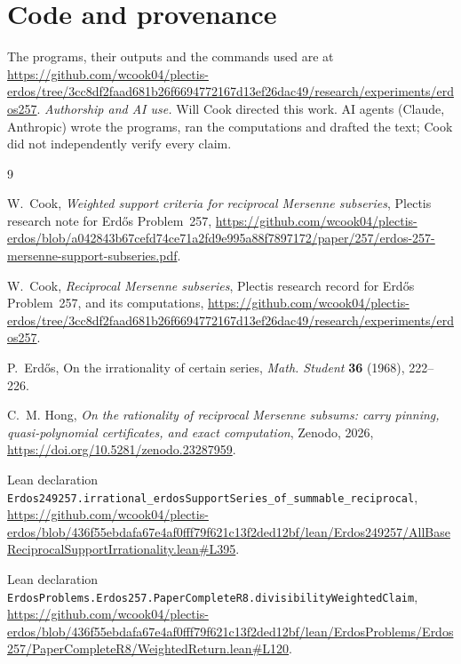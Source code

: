 \documentclass[11pt]{amsart}
\newcommand{\pin}{436f55ebdafa67e4af0fff79f621c13f2ded12bf}
\newcommand{\codeurl}{https://github.com/wcook04/plectis-erdos/tree/3cc8df2faad681b26f6694772167d13ef26dac49/research/experiments/erdos257}
\begin{document}
\section*{Code and provenance}
The programs, their outputs and the commands used are at \url{\codeurl}.
\emph{Authorship and AI use.} Will Cook directed this work. AI agents (Claude,
Anthropic) wrote the programs, ran the computations and drafted the text; Cook
did not independently verify every claim.

{\small
\begin{thebibliography}{9}

W.~Cook, \emph{Weighted support criteria for reciprocal Mersenne subseries},
Plectis research note for Erd\H{o}s Problem~257,
\url{https://github.com/wcook04/plectis-erdos/blob/a042843b67cefd74ce71a2fd9e995a88f7897172/paper/257/erdos-257-mersenne-support-subseries.pdf}.

W.~Cook, \emph{Reciprocal Mersenne subseries}, Plectis research record for
Erd\H{o}s Problem~257, and its computations,
\url{\codeurl}.

P.~Erd\H{o}s, On the irrationality of certain series, \emph{Math. Student}
\textbf{36} (1968), 222--226.

C.~M. Hong, \emph{On the rationality of reciprocal Mersenne subsums: carry
pinning, quasi-polynomial certificates, and exact computation}, Zenodo, 2026,
\url{https://doi.org/10.5281/zenodo.23287959}.

Lean declaration
\texttt{Erdos249257.irrational\_erdosSupportSeries\_of\_summable\_reciprocal},
\url{https://github.com/wcook04/plectis-erdos/blob/\pin/lean/Erdos249257/AllBaseReciprocalSupportIrrationality.lean\#L395}.

Lean declaration
\texttt{ErdosProblems.Erdos257.PaperCompleteR8.divisibilityWeightedClaim},
\url{https://github.com/wcook04/plectis-erdos/blob/\pin/lean/ErdosProblems/Erdos257/PaperCompleteR8/WeightedReturn.lean\#L120}.

\end{thebibliography}}
\end{document}
